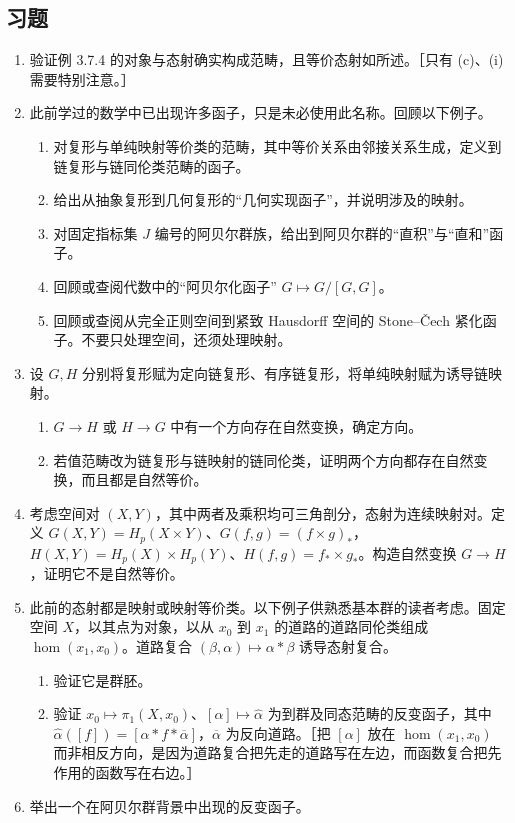 \subsection*{习题}
\begin{enumerate}
\item 验证例 3.7.4 的对象与态射确实构成范畴，且等价态射如所述。［只有 (c)、(i) 需要特别注意。］
\item 此前学过的数学中已出现许多函子，只是未必使用此名称。回顾以下例子。
\begin{enumerate}[label=(\alph*)]
\item 对复形与单纯映射等价类的范畴，其中等价关系由邻接关系生成，定义到链复形与链同伦类范畴的函子。
\item 给出从抽象复形到几何复形的“几何实现函子”，并说明涉及的映射。
\item 对固定指标集 $J$ 编号的阿贝尔群族，给出到阿贝尔群的“直积”与“直和”函子。
\item 回顾或查阅代数中的“阿贝尔化函子” $G\mapsto G/[G,G]$。
\item 回顾或查阅从完全正则空间到紧致 Hausdorff 空间的 Stone--Čech 紧化函子。不要只处理空间，还须处理映射。
\end{enumerate}
\item 设 $G,H$ 分别将复形赋为定向链复形、有序链复形，将单纯映射赋为诱导链映射。
\begin{enumerate}[label=(\alph*)]
\item $G\to H$ 或 $H\to G$ 中有一个方向存在自然变换，确定方向。
\item 若值范畴改为链复形与链映射的链同伦类，证明两个方向都存在自然变换，而且都是自然等价。
\end{enumerate}
\item 考虑空间对 $(X,Y)$，其中两者及乘积均可三角剖分，态射为连续映射对。定义 $G(X,Y)=H_p(X\times Y)$、$G(f,g)=(f\times g)_*$，$H(X,Y)=H_p(X)\times H_p(Y)$、$H(f,g)=f_*\times g_*$。构造自然变换 $G\to H$，证明它不是自然等价。
\item 此前的态射都是映射或映射等价类。以下例子供熟悉基本群的读者考虑。固定空间 $X$，以其点为对象，以从 $x_0$ 到 $x_1$ 的道路的道路同伦类组成 $\operatorname{hom}(x_1,x_0)$。道路复合 $(\beta,\alpha)\mapsto\alpha*\beta$ 诱导态射复合。
\begin{enumerate}[label=(\alph*)]
\item 验证它是群胚。
\item 验证 $x_0\mapsto\pi_1(X,x_0)$、$[\alpha]\mapsto\widehat\alpha$ 为到群及同态范畴的反变函子，其中 $\widehat\alpha([f])=[\alpha*f*\overline\alpha]$，$\overline\alpha$ 为反向道路。［把 $[\alpha]$ 放在 $\operatorname{hom}(x_1,x_0)$ 而非相反方向，是因为道路复合把先走的道路写在左边，而函数复合把先作用的函数写在右边。］
\end{enumerate}
\item 举出一个在阿贝尔群背景中出现的反变函子。
\end{enumerate}
